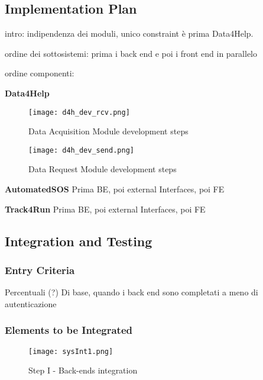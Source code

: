 \subsection{Implementation Plan}

intro: indipendenza dei moduli, unico constraint è prima Data4Help.

ordine dei sottosistemi: prima i back end e poi i front end in parallelo

ordine componenti:

\textbf{Data4Help}

\FloatBarrier
\begin{figure}[!h]
	\centering
	\texttt{[image: d4h\_dev\_rcv.png]}
	\caption{Data Acquisition Module development steps}
\end{figure}
 
\FloatBarrier

\FloatBarrier
\begin{figure}[!h]
	\centering
	\texttt{[image: d4h\_dev\_send.png]}
	\caption{Data Request Module development steps}
\end{figure}

\FloatBarrier

\textbf{AutomatedSOS}
Prima BE, poi external Interfaces, poi FE

\textbf{Track4Run}
Prima BE, poi external Interfaces, poi FE

\subsection{Integration and Testing}
\subsubsection{Entry Criteria}
Percentuali (?)
Di base, quando i back end sono completati a meno di autenticazione

\subsubsection{Elements to be Integrated}

\FloatBarrier
\begin{figure}[!h]
	\centering
	\texttt{[image: sysInt1.png]}
	\caption{Step I - Back-ends integration}
\end{figure}

\FloatBarrier

\vspace{2px}
 
